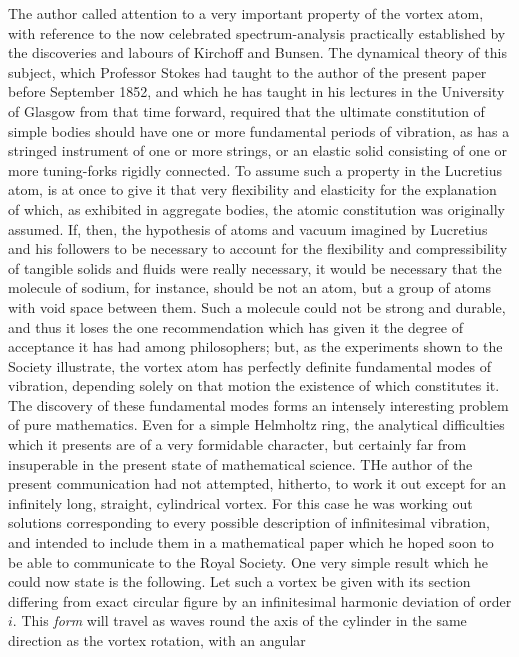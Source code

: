The author called attention to a very important property of the vortex atom,
with reference to the now celebrated spectrum-analysis practically established
by the discoveries and labours of Kirchoff and Bunsen. The dynamical theory of
this subject, which Professor Stokes had taught to the author of the present
paper before September 1852, and which he has taught in his lectures in the
University of Glasgow from that time forward, required that the ultimate
constitution of simple bodies should have one or more fundamental periods of
vibration, as has a stringed instrument of one or more strings, or an elastic
solid consisting of one or more tuning-forks rigidly connected. To assume such
a property in the Lucretius atom, is at once to give it that very flexibility
and elasticity for the explanation of which, as exhibited in aggregate bodies,
the atomic constitution was originally assumed. If, then, the hypothesis of
atoms and vacuum imagined by Lucretius and his followers to be necessary to
account for the flexibility and compressibility of tangible solids and fluids
were really necessary, it would be necessary that the molecule of sodium, for
instance, should be not an atom, but a group of atoms with void space between
them. Such a molecule could not be strong and durable, and thus it loses the
one recommendation which has given it the degree of acceptance it has had among
philosophers; but, as the experiments shown to the Society illustrate, the
vortex atom has perfectly definite fundamental modes of vibration, depending
solely on that motion the existence of which constitutes it. The discovery of
these fundamental modes forms an intensely interesting problem of pure
mathematics. Even for a simple Helmholtz ring, the analytical difficulties
which it presents are of a very formidable character, but certainly far from
insuperable in the present state of mathematical science. THe author of the
present communication had not attempted, hitherto, to work it out except for an
infinitely long, straight, cylindrical vortex. For this case he was working out
solutions corresponding to every possible description of infinitesimal
vibration, and intended to include them in a mathematical paper which he hoped
soon to be able to communicate to the Royal Society. One very simple result
which he could now state is the following. Let such a vortex be given with its
section differing from exact circular figure by an infinitesimal harmonic
deviation of order $i$. This {\it form\/} will travel as waves round the axis
of the cylinder in the same direction as the vortex rotation, with an angular
